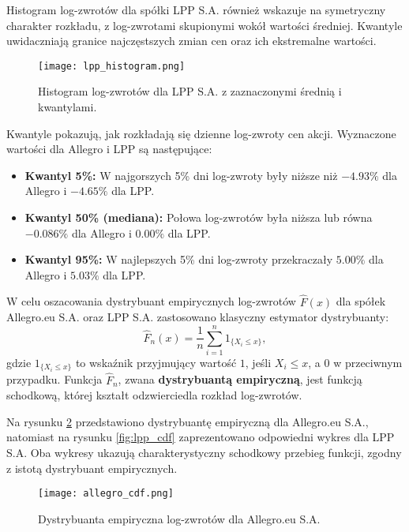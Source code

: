 \documentclass[12pt]{article}
\begin{document}
Histogram log-zwrotów dla spółki LPP S.A. również wskazuje na symetryczny charakter rozkładu, z log-zwrotami skupionymi wokół wartości średniej. Kwantyle uwidaczniają granice najczęstszych zmian cen oraz ich ekstremalne wartości.

\begin{figure}[H]
    \centering
    \texttt{[image: lpp\_histogram.png]}
    \caption{Histogram log-zwrotów dla LPP S.A. z zaznaczonymi średnią i kwantylami.}
    \label{fig:lpp_histogram}
\end{figure}


Kwantyle pokazują, jak rozkładają się dzienne log-zwroty cen akcji. Wyznaczone wartości dla Allegro i LPP są następujące:

\begin{itemize}
    \item \textbf{Kwantyl 5\%:} W najgorszych 5\% dni log-zwroty były niższe niż \(-4.93\%\) dla Allegro i \(-4.65\%\) dla LPP.
    \item \textbf{Kwantyl 50\% (mediana):} Połowa log-zwrotów była niższa lub równa \(-0.086\%\) dla Allegro i \(0.00\%\) dla LPP.
    \item \textbf{Kwantyl 95\%:} W najlepszych 5\% dni log-zwroty przekraczały \(5.00\%\) dla Allegro i \(5.03\%\) dla LPP.
\end{itemize}


W celu oszacowania dystrybuant empirycznych log-zwrotów \( \hat{F}(x) \) dla spółek Allegro.eu S.A. oraz LPP S.A. zastosowano klasyczny estymator dystrybuanty:
\[
\hat{F}_n(x) = \frac{1}{n} \sum_{i=1}^n 1_{\{X_i \leq x\}},
\]
gdzie \( 1_{\{X_i \leq x\}} \) to wskaźnik przyjmujący wartość \( 1 \), jeśli \( X_i \leq x \), a \( 0 \) w przeciwnym przypadku. Funkcja \( \hat{F}_n \), zwana \textbf{dystrybuantą empiryczną}, jest funkcją schodkową, której kształt odzwierciedla rozkład log-zwrotów.

Na rysunku \ref{fig:allegro_cdf} przedstawiono dystrybuantę empiryczną dla Allegro.eu S.A., natomiast na rysunku \ref{fig:lpp_cdf} zaprezentowano odpowiedni wykres dla LPP S.A. Oba wykresy ukazują charakterystyczny schodkowy przebieg funkcji, zgodny z istotą dystrybuant empirycznych.

\begin{figure}[H]
    \centering
    \texttt{[image: allegro\_cdf.png]}
    \caption{Dystrybuanta empiryczna log-zwrotów dla Allegro.eu S.A.}
    \label{fig:allegro_cdf}
\end{figure}
\end{document}
